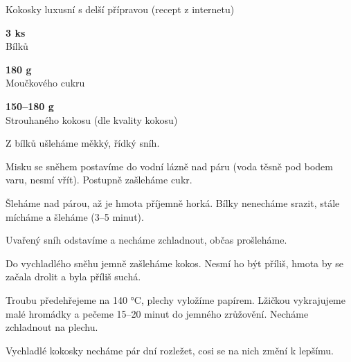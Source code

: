 \documentclass[11pt,a4paper]{article}
\begin{document}
\begin{recipe}[PaleTurquoise]{Kokosky luxusní s delší přípravou (recept z internetu)}
    \begin{ingredients}
        \item \parbox[t]{\linewidth}{\raggedright \piece \textbf{3 ks}\\ Bílků}
        \item \parbox[t]{\linewidth}{\raggedright \weight \textbf{180 g}\\ Moučkového cukru}
        \item \parbox[t]{\linewidth}{\raggedright \weight \textbf{150--180 g}\\ Strouhaného kokosu (dle kvality kokosu)}
    \end{ingredients}
    \begin{steps}
        \item Z bílků ušleháme měkký, řídký sníh.
        \item Misku se sněhem postavíme do vodní lázně nad páru (voda těsně pod bodem varu, nesmí vřít). Postupně zašleháme cukr.
        \item Šleháme nad párou, až je hmota příjemně horká. Bílky nenecháme srazit, stále mícháme a šleháme (3–5 minut).
        \item Uvařený sníh odstavíme a necháme zchladnout, občas prošleháme.
        \item Do vychladlého sněhu jemně zašleháme kokos. Nesmí ho být příliš, hmota by se začala drolit a byla příliš suchá.
        \item Troubu předehřejeme na 140 °C, plechy vyložíme papírem. Lžičkou vykrajujeme malé hromádky a pečeme 15--20 minut do jemného zrůžovění. Necháme zchladnout na plechu.
        \item Vychladlé kokosky necháme pár dní rozležet, cosi se na nich změní k lepšímu.
    \end{steps}
\end{recipe}
\end{document}
